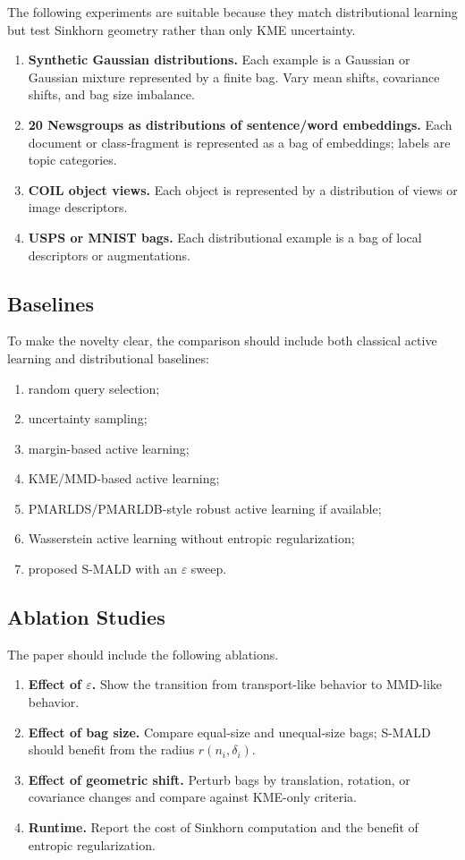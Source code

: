 \documentclass[11pt,a4paper]{article}
\begin{document}
The following experiments are suitable because they match distributional learning but test Sinkhorn geometry rather than only KME uncertainty.
\begin{enumerate}[leftmargin=1.4em]
    \item \textbf{Synthetic Gaussian distributions.} Each example is a Gaussian or Gaussian mixture represented by a finite bag. Vary mean shifts, covariance shifts, and bag size imbalance.
    \item \textbf{20 Newsgroups as distributions of sentence/word embeddings.} Each document or class-fragment is represented as a bag of embeddings; labels are topic categories.
    \item \textbf{COIL object views.} Each object is represented by a distribution of views or image descriptors.
    \item \textbf{USPS or MNIST bags.} Each distributional example is a bag of local descriptors or augmentations.
\end{enumerate}

\subsection{Baselines}

To make the novelty clear, the comparison should include both classical active learning and distributional baselines:
\begin{enumerate}[leftmargin=1.4em]
    \item random query selection;
    \item uncertainty sampling;
    \item margin-based active learning;
    \item KME/MMD-based active learning;
    \item PMARLDS/PMARLDB-style robust active learning if available;
    \item Wasserstein active learning without entropic regularization;
    \item proposed S-MALD with an $\varepsilon$ sweep.
\end{enumerate}

\subsection{Ablation Studies}

The paper should include the following ablations.
\begin{enumerate}[leftmargin=1.4em]
    \item \textbf{Effect of $\varepsilon$.} Show the transition from transport-like behavior to MMD-like behavior.
    \item \textbf{Effect of bag size.} Compare equal-size and unequal-size bags; S-MALD should benefit from the radius $r(n_i,\delta_i)$.
    \item \textbf{Effect of geometric shift.} Perturb bags by translation, rotation, or covariance changes and compare against KME-only criteria.
    \item \textbf{Runtime.} Report the cost of Sinkhorn computation and the benefit of entropic regularization.
\end{enumerate}
\end{document}
